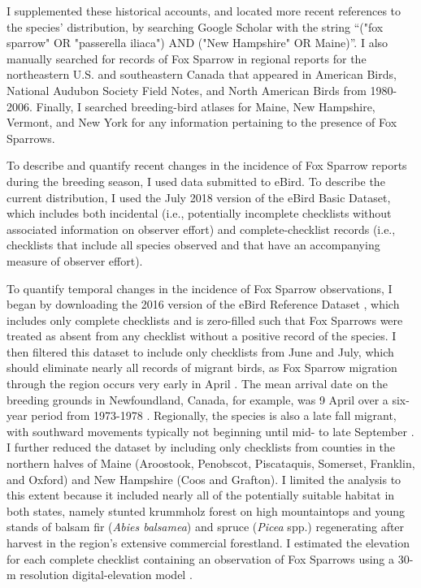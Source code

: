 \documentclass[fleqn,10pt,lineno]{wlpeerj} %
\begin{document}
I supplemented these historical accounts, and located more recent references to the species’ distribution, by searching Google Scholar with the string “("fox sparrow" OR "passerella iliaca") AND ("New Hampshire" OR Maine)”. I also manually searched for records of Fox Sparrow in regional reports for the northeastern U.S. and southeastern Canada that appeared in American Birds, National Audubon Society Field Notes, and North American Birds from 1980-2006. Finally, I searched breeding-bird atlases for Maine, New Hampshire, Vermont, and New York for any information pertaining to the presence of Fox Sparrows.

To describe and quantify recent changes in the incidence of Fox Sparrow reports during the breeding season, I used data submitted to eBird. To describe the current distribution, I used the July 2018 version of the eBird Basic Dataset, which includes both incidental (i.e., potentially incomplete checklists without associated information on observer effort) and complete-checklist records (i.e., checklists that include all species observed and that have an accompanying measure of observer effort). 

To quantify temporal changes in the incidence of Fox Sparrow observations, I began by downloading the 2016 version of the eBird Reference Dataset \citep{Fink2017-om}, which includes only complete checklists and is zero-filled such that Fox Sparrows were treated as absent from any checklist without a positive record of the species. I then filtered this dataset to include only checklists from June and July, which should eliminate nearly all records of migrant birds, as Fox Sparrow migration through the region occurs very early in April \citep{Weckstein2002-px}. The mean arrival date on the breeding grounds in Newfoundland, Canada, for example, was 9 April over a six-year period from 1973-1978 \citep{Threlfall1982-wd}. Regionally, the species is also a late fall migrant, with southward movements typically not beginning until mid- to late September \citep{Weckstein2002-px}. I further reduced the dataset by including only checklists from counties in the northern halves of Maine (Aroostook, Penobscot, Piscataquis, Somerset, Franklin, and Oxford) and New Hampshire (Coos and Grafton). I limited the analysis to this extent because it included nearly all of the potentially suitable habitat in both states, namely stunted krummholz forest on high mountaintops and young stands of balsam fir (\textit{Abies balsamea}) and spruce (\textit{Picea} spp.) regenerating after harvest in the region’s extensive commercial forestland. I estimated the elevation for each complete checklist containing an observation of Fox Sparrows using a 30-m resolution digital-elevation model \citep{farr2007shuttle}.
\end{document}
